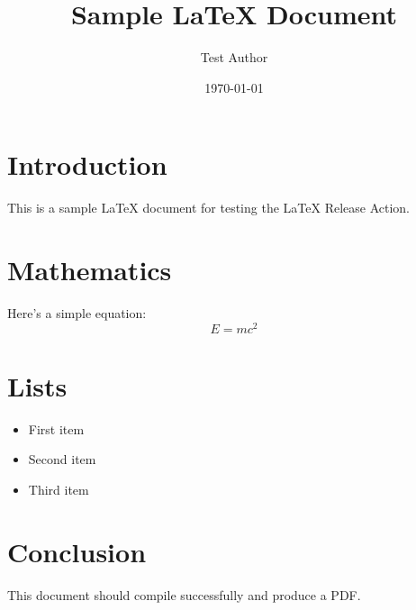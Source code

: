 \documentclass{article}
\title{Sample LaTeX Document}
\author{Test Author}
\date{\today}
\begin{document}
\maketitle

\section{Introduction}
This is a sample LaTeX document for testing the LaTeX Release Action.

\section{Mathematics}
Here's a simple equation:
\begin{equation}
    E = mc^2
\end{equation}

\section{Lists}
\begin{itemize}
    \item First item
    \item Second item
    \item Third item
\end{itemize}

\section{Conclusion}
This document should compile successfully and produce a PDF.
\end{document}

